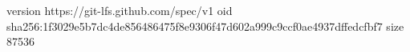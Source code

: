 version https://git-lfs.github.com/spec/v1
oid sha256:1f3029e5b7dc4de856486475f8e9306f47d602a999c9ccf0ae4937dffedcfbf7
size 87536
